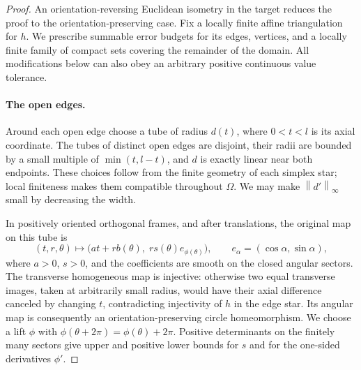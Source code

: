 \documentclass[11pt]{article}
\numberwithin{equation}{section}
\theoremstyle{definition}
\theoremstyle{remark}
\newcommand{\norm}[1]{\left\lVert #1\right\rVert}
\begin{document}
\begin{proof}
An orientation-reversing Euclidean isometry in the target reduces
the proof to the orientation-preserving case.  Fix a locally finite
affine triangulation for $h$.  We prescribe summable error budgets
for its edges, vertices, and a locally finite family of compact sets
covering the remainder of the domain.  All modifications below can
also obey an arbitrary positive continuous value tolerance.

\paragraph{The open edges.}
Around each open edge choose a tube of radius $d(t)$, where
$0<t<l$ is its axial coordinate.  The tubes of distinct open edges
are disjoint, their radii are bounded by a small multiple of
$\min(t,l-t)$, and $d$ is exactly linear near both endpoints.
These choices follow from the finite geometry of each simplex star;
local finiteness makes them compatible throughout $\Omega$.
We may make $\norm{d'}_\infty$ small by decreasing the width.

In positively oriented orthogonal frames, and after translations,
the original map on this tube is
\begin{equation}
 \label{sm:edge-form}
 (t,r,\theta)\longmapsto
 \bigl(at+r b(\theta),\;r s(\theta)e_{\phi(\theta)}\bigr),
 \qquad e_\alpha=(\cos\alpha,\sin\alpha),
\end{equation}
where $a>0$, $s>0$, and the coefficients are smooth on the closed
angular sectors.  The transverse homogeneous map is injective:
otherwise two equal transverse images, taken at arbitrarily small
radius, would have their axial difference canceled by changing $t$,
contradicting injectivity of $h$ in the edge star.  Its angular
map is consequently an orientation-preserving circle
homeomorphism.  We choose a lift $\phi$ with
$\phi(\theta+2\pi)=\phi(\theta)+2\pi$.
Positive determinants on the finitely many sectors give upper and
positive lower bounds for $s$ and for the one-sided derivatives
$\phi'$.


\end{proof}
\end{document}
